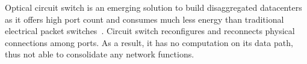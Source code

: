 







Optical circuit switch is an emerging solution to build disaggregated datacenters as it offers high port count and consumes much less energy than traditional electrical packet switches~\cite{shoal-nsdi19,helios-sigcomm10,sirius-sigcomm20, sipml-sigcomm21}. Circuit switch reconfigures and reconnects physical connections among ports. As a result, it has no computation on its data path, thus not able to consolidate any network functions.
\fi

